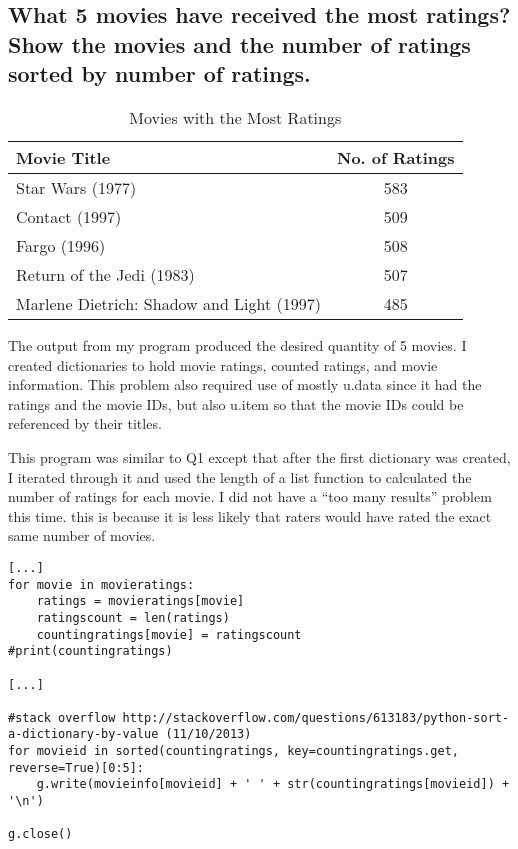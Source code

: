 \documentclass{article}
\begin{document}

\newpage
\subsection{What 5 movies have received the most ratings? Show the movies and the number of ratings sorted by number of ratings.}

\begin{table}[!h]
\centering
\begin{tabular}{l c}
Movie Title & No. of Ratings \\
\hline
Star Wars (1977) & 583  \\
Contact (1997) & 509  \\
Fargo (1996) & 508  \\
Return of the Jedi (1983) & 507  \\
Marlene Dietrich: Shadow and Light (1997) & 485  \\
\hline
\end{tabular}
\caption{Movies with the Most Ratings}
\end{table}

The output from my program produced the desired quantity of 5 movies. I created dictionaries to hold movie ratings, counted ratings, and movie information. This problem also required use of mostly u.data since it had the ratings and the movie IDs, but also u.item so that the movie IDs could be referenced by their titles.

This program was similar to Q1 except that after the first dictionary was created, I iterated through it and used the length of a list function to calculated the number of ratings for each movie. I did not have a ``too many results'' problem this time. this is because it is less likely that raters would have rated the exact same number of movies.

\begin{lstlisting}[frame=single, caption=mostratings.py, label=mostratings]
[...]
for movie in movieratings:
	ratings = movieratings[movie]
	ratingscount = len(ratings)
	countingratings[movie] = ratingscount
#print(countingratings)

[...]

#stack overflow http://stackoverflow.com/questions/613183/python-sort-a-dictionary-by-value (11/10/2013)
for movieid in sorted(countingratings, key=countingratings.get, reverse=True)[0:5]:
	g.write(movieinfo[movieid] + ' ' + str(countingratings[movieid]) + '\n')

g.close()
\end{lstlisting}
\end{document}
